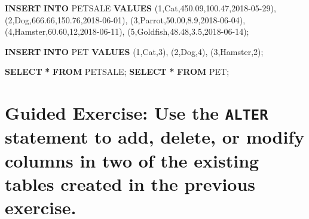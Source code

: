 \documentclass[
]{book}
\newenvironment{Shaded}{\begin{snugshade}}{\end{snugshade}}
\newcommand{\DecValTok}[1]{\textcolor[rgb]{0.00,0.00,0.81}{#1}}
\newcommand{\FloatTok}[1]{\textcolor[rgb]{0.00,0.00,0.81}{#1}}
\newcommand{\KeywordTok}[1]{\textcolor[rgb]{0.13,0.29,0.53}{\textbf{#1}}}
\newcommand{\NormalTok}[1]{#1}
\newcommand{\OperatorTok}[1]{\textcolor[rgb]{0.81,0.36,0.00}{\textbf{#1}}}
\newcommand{\StringTok}[1]{\textcolor[rgb]{0.31,0.60,0.02}{#1}}
\begin{document}
\begin{Shaded}
\begin{Highlighting}[]
\KeywordTok{INSERT} \KeywordTok{INTO}\NormalTok{ PETSALE }\KeywordTok{VALUES}
\NormalTok{    (}\DecValTok{1}\NormalTok{,}\StringTok{\textquotesingle{}Cat\textquotesingle{}}\NormalTok{,}\FloatTok{450.09}\NormalTok{,}\FloatTok{100.47}\NormalTok{,}\StringTok{\textquotesingle{}2018{-}05{-}29\textquotesingle{}}\NormalTok{),}
\NormalTok{    (}\DecValTok{2}\NormalTok{,}\StringTok{\textquotesingle{}Dog\textquotesingle{}}\NormalTok{,}\FloatTok{666.66}\NormalTok{,}\FloatTok{150.76}\NormalTok{,}\StringTok{\textquotesingle{}2018{-}06{-}01\textquotesingle{}}\NormalTok{),}
\NormalTok{    (}\DecValTok{3}\NormalTok{,}\StringTok{\textquotesingle{}Parrot\textquotesingle{}}\NormalTok{,}\FloatTok{50.00}\NormalTok{,}\FloatTok{8.9}\NormalTok{,}\StringTok{\textquotesingle{}2018{-}06{-}04\textquotesingle{}}\NormalTok{),}
\NormalTok{    (}\DecValTok{4}\NormalTok{,}\StringTok{\textquotesingle{}Hamster\textquotesingle{}}\NormalTok{,}\FloatTok{60.60}\NormalTok{,}\DecValTok{12}\NormalTok{,}\StringTok{\textquotesingle{}2018{-}06{-}11\textquotesingle{}}\NormalTok{),}
\NormalTok{    (}\DecValTok{5}\NormalTok{,}\StringTok{\textquotesingle{}Goldfish\textquotesingle{}}\NormalTok{,}\FloatTok{48.48}\NormalTok{,}\FloatTok{3.5}\NormalTok{,}\StringTok{\textquotesingle{}2018{-}06{-}14\textquotesingle{}}\NormalTok{);}
    
\KeywordTok{INSERT} \KeywordTok{INTO}\NormalTok{ PET }\KeywordTok{VALUES}
\NormalTok{    (}\DecValTok{1}\NormalTok{,}\StringTok{\textquotesingle{}Cat\textquotesingle{}}\NormalTok{,}\DecValTok{3}\NormalTok{),}
\NormalTok{    (}\DecValTok{2}\NormalTok{,}\StringTok{\textquotesingle{}Dog\textquotesingle{}}\NormalTok{,}\DecValTok{4}\NormalTok{),}
\NormalTok{    (}\DecValTok{3}\NormalTok{,}\StringTok{\textquotesingle{}Hamster\textquotesingle{}}\NormalTok{,}\DecValTok{2}\NormalTok{);}
    
\KeywordTok{SELECT} \OperatorTok{*} \KeywordTok{FROM}\NormalTok{ PETSALE;}
\KeywordTok{SELECT} \OperatorTok{*} \KeywordTok{FROM}\NormalTok{ PET;}
\end{Highlighting}
\end{Shaded}

\hypertarget{guided-exercise-use-the-alter-statement-to-add-delete-or-modify-columns-in-two-of-the-existing-tables-created-in-the-previous-exercise.}{%
\section{\texorpdfstring{Guided Exercise: Use the \texttt{ALTER} statement to add, delete, or modify columns in two of the existing tables created in the previous exercise.}{Guided Exercise: Use the ALTER statement to add, delete, or modify columns in two of the existing tables created in the previous exercise.}}\label{guided-exercise-use-the-alter-statement-to-add-delete-or-modify-columns-in-two-of-the-existing-tables-created-in-the-previous-exercise.}}
\end{document}

